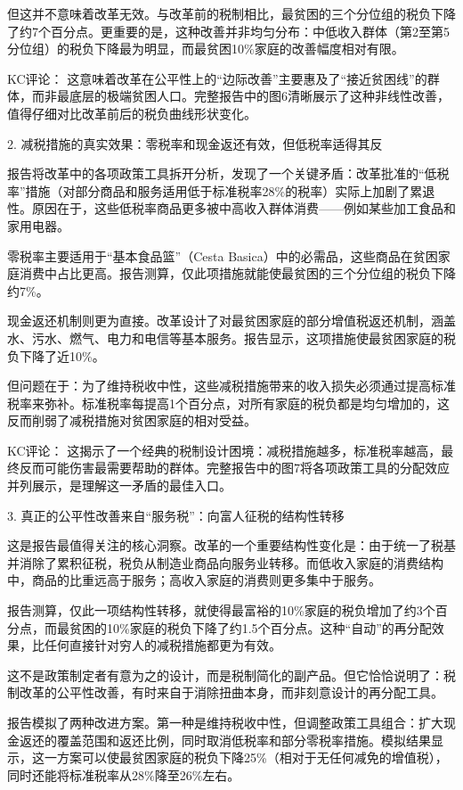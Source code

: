 \documentclass[11pt]{ctexart}
\begin{document}
但这并不意味着改革无效。与改革前的税制相比，最贫困的三个分位组的税负下降了约7个百分点。更重要的是，这种改善并非均匀分布：中低收入群体（第2至第5分位组）的税负下降最为明显，而最贫困10\%家庭的改善幅度相对有限。

KC评论： 这意味着改革在公平性上的“边际改善”主要惠及了“接近贫困线”的群体，而非最底层的极端贫困人口。完整报告中的图6清晰展示了这种非线性改善，值得仔细对比改革前后的税负曲线形状变化。

2. 减税措施的真实效果：零税率和现金返还有效，但低税率适得其反

报告将改革中的各项政策工具拆开分析，发现了一个关键矛盾：改革批准的“低税率”措施（对部分商品和服务适用低于标准税率28\%的税率）实际上加剧了累退性。原因在于，这些低税率商品更多被中高收入群体消费——例如某些加工食品和家用电器。

零税率主要适用于“基本食品篮”（Cesta Basica）中的必需品，这些商品在贫困家庭消费中占比更高。报告测算，仅此项措施就能使最贫困的三个分位组的税负下降约7\%。

现金返还机制则更为直接。改革设计了对最贫困家庭的部分增值税返还机制，涵盖水、污水、燃气、电力和电信等基本服务。报告显示，这项措施使最贫困家庭的税负下降了近10\%。

但问题在于：为了维持税收中性，这些减税措施带来的收入损失必须通过提高标准税率来弥补。标准税率每提高1个百分点，对所有家庭的税负都是均匀增加的，这反而削弱了减税措施对贫困家庭的相对受益。

KC评论： 这揭示了一个经典的税制设计困境：减税措施越多，标准税率越高，最终反而可能伤害最需要帮助的群体。完整报告中的图7将各项政策工具的分配效应并列展示，是理解这一矛盾的最佳入口。

3. 真正的公平性改善来自“服务税”：向富人征税的结构性转移

这是报告最值得关注的核心洞察。改革的一个重要结构性变化是：由于统一了税基并消除了累积征税，税负从制造业商品向服务业转移。而低收入家庭的消费结构中，商品的比重远高于服务；高收入家庭的消费则更多集中于服务。

报告测算，仅此一项结构性转移，就使得最富裕的10\%家庭的税负增加了约3个百分点，而最贫困的10\%家庭的税负下降了约1.5个百分点。这种“自动”的再分配效果，比任何直接针对穷人的减税措施都更为有效。

这不是政策制定者有意为之的设计，而是税制简化的副产品。但它恰恰说明了：税制改革的公平性改善，有时来自于消除扭曲本身，而非刻意设计的再分配工具。

报告模拟了两种改进方案。第一种是维持税收中性，但调整政策工具组合：扩大现金返还的覆盖范围和返还比例，同时取消低税率和部分零税率措施。模拟结果显示，这一方案可以使最贫困家庭的税负下降25\%（相对于无任何减免的增值税），同时还能将标准税率从28\%降至26\%左右。
\end{document}
